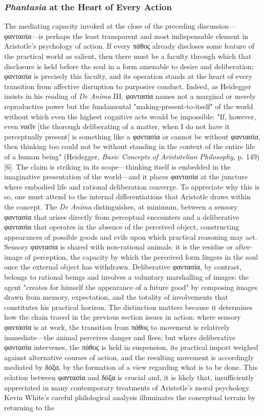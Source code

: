 \documentclass{article}
\begin{document}
\subsubsection*{\textit{Phantasia} at the Heart of Every Action}

The mediating capacity invoked at the close of the preceding discussion—φαντασία—is perhaps the least transparent and most indispensable element in Aristotle's psychology of action. If every πάθος already discloses some feature of the practical world as salient, then there must be a faculty through which that disclosure is held before the soul in a form amenable to desire and deliberation; φαντασία is precisely this faculty, and its operation stands at the heart of every transition from affective disruption to purposive conduct. Indeed, as Heidegger insists in his reading of \textit{De Anima} III, φαντασία names not a marginal or merely reproductive power but the fundamental "making-present-to-itself" of the world without which even the highest cognitive acts would be impossible: "If, however, even νοεῖν [the thorough deliberating of a matter, when I do not have it perceptually present] is something like a φαντασία or cannot be without φαντασία, then thinking too could not be without standing in the context of the entire life of a human being" (Heidegger, \textit{Basic Concepts of Aristotelian Philosophy}, p. 149)[6]. The claim is striking in its scope—thinking itself is embedded in the imaginative presentation of the world—and it places φαντασία at the juncture where embodied life and rational deliberation converge. To appreciate why this is so, one must attend to the internal differentiations that Aristotle draws within the concept. The \textit{De Anima} distinguishes, at minimum, between a sensory φαντασία that arises directly from perceptual encounters and a deliberative φαντασία that operates in the absence of the perceived object, constructing appearances of possible goods and evils upon which practical reasoning may act. Sensory φαντασία is shared with non-rational animals; it is the residue or after-image of perception, the capacity by which the perceived form lingers in the soul once the external object has withdrawn. Deliberative φαντασία, by contrast, belongs to rational beings and involves a voluntary marshalling of images: the agent "creates for himself the appearance of a future good" by composing images drawn from memory, expectation, and the totality of involvements that constitutes his practical horizon. The distinction matters because it determines how the chain traced in the previous section issues in action: where sensory φαντασία is at work, the transition from πάθος to movement is relatively immediate—the animal perceives danger and flees; but where deliberative φαντασία intervenes, the πάθος is held in suspension, its practical import weighed against alternative courses of action, and the resulting movement is accordingly mediated by δόξα, by the formation of a view regarding what is to be done. This relation between φαντασία and δόξα is crucial and, it is likely that, insufficiently appreciated in many contemporary treatments of Aristotle's moral psychology. Kevin White's careful philological analysis illuminates the conceptual terrain by returning to the 
\end{document}
